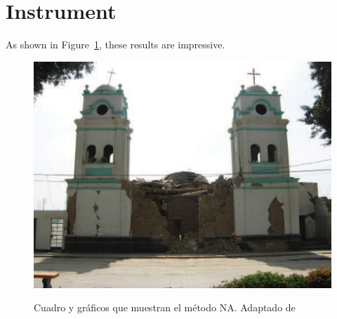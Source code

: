 \section{Instrument}
\label{app:instrument}

As shown in Figure~\ref{fig:Figure2}, these results are impressive. \lipsum[20]

\begin{figure}[ht]
  \caption[Cuadro y gráficos que muestran el método NA]{Cuadro y gráficos que muestran el método NA. Adaptado de \cite{JRLevin2000}}
  \includegraphics[scale=0.70]{F_Figures/11_Chapter II/Cap2_Imagen3c.png}
	\label{fig:Figure2}
\end{figure}

\lipsum[21]